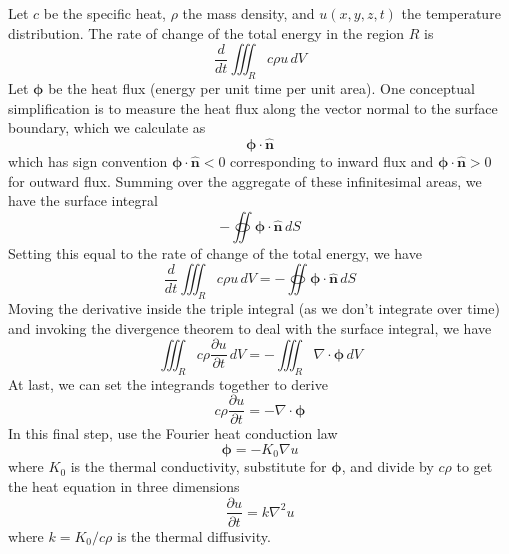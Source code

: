 \documentclass[a4paper]{article}
\begin{document}
\newpage


Let \( c \) be the specific heat, \( \rho \) the mass density, and \( u \!\left( x,y,z,t \right) \) the temperature distribution. The rate of change of the total energy in the region \( R \) is
\[
	\frac{d }{dt} \iiint_{R} c \rho u \, dV 
\]
Let \( \pmb{\phi} \) be the heat flux (energy per unit time per unit area). One conceptual simplification is to measure the heat flux along the vector normal to the surface boundary, which we calculate as 
\[
	\pmb{\phi} \cdot \pmb{\hat{n}} 
\]
which has sign convention \( \pmb{\phi} \cdot \pmb{\hat{n}} < 0 \) corresponding to inward flux and \( \pmb{\phi} \cdot \pmb{\hat{n}} > 0 \) for outward flux. Summing over the aggregate of these infinitesimal areas, we have the surface integral
\[
	-\oiint \pmb{\phi} \cdot \pmb{\hat{n}} \, dS 
\]
Setting this equal to the rate of change of the total energy, we have
\[
	\frac{d }{d t}\iiint_{R} c \rho u \, dV = -\oiint \pmb{\phi} \cdot \pmb{\hat{n}} \, dS
\]
Moving the derivative inside the triple integral (as we don't integrate over time) and invoking the divergence theorem to deal with the surface integral, we have
\[
	\iiint_{R} c \rho \frac{\partial u}{\partial t} \, dV = -\iiint_{R} \nabla \cdot \pmb{\phi} \, dV
\]
At last, we can set the integrands together to derive
\[
	c \rho \frac{\partial u}{\partial t} = -\nabla \cdot \pmb{\phi} 
\]
In this final step, use the Fourier heat conduction law
\[
	\pmb{\phi} = -K_{0}\nabla u 
\]
where \( K_{0} \) is the thermal conductivity, substitute for \( \pmb{\phi} \), and divide by \( c \rho \) to get the heat equation in three dimensions
\[
	 \frac{\partial u}{\partial t} = k \nabla^{2}u
\]
where \( k = K_{0} / c \rho \) is the thermal diffusivity.

\newpage

\end{document}
